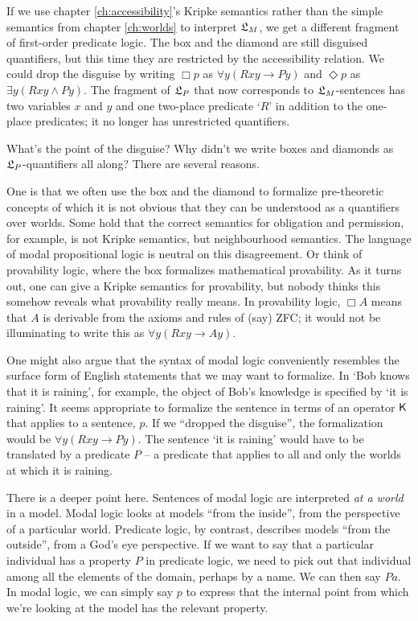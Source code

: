 If we use chapter \ref{ch:accessibility}'s Kripke semantics rather than the
simple semantics from chapter \ref{ch:worlds} to interpret $\mathfrak{L}_{M}$, we get a
different fragment of first-order predicate logic. The box and the diamond are
still disguised quantifiers, but this time they are restricted by the
accessibility relation. We could drop the disguise by writing $\Box p$ as
$\forall y(Rxy \to Py)$ and $\Diamond p$ as $\exists y(Rxy \land Py)$. The
fragment of $\mathfrak{L}_P$ that now corresponds to $\mathfrak{L}_M$-sentences has two variables
$x$ and $y$ and one two-place predicate `$R$' in addition to the one-place
predicates; it no longer has unrestricted quantifiers.

What's the point of the disguise? Why didn't we write boxes and diamonds as
$\mathfrak{L}_P$-quantifiers all along? There are several reasons.

One is that we often use the box and the diamond to formalize pre-theoretic
concepts of which it is not obvious that they can be understood as a quantifiers
over worlds. Some hold that the correct semantics for obligation and permission,
for example, is not Kripke semantics, but neighbourhood semantics. The language
of modal propositional logic is neutral on this disagreement. Or think of
provability logic, where the box formalizes mathematical provability. As it
turns out, one can give a Kripke semantics for provability, but nobody thinks
this somehow reveals what provability really means. In provability logic,
$\Box A$ means that $A$ is derivable from the axioms and rules of (say) ZFC; it
would not be illuminating to write this as $\forall y(Rxy \to Ay)$.

One might also argue that the syntax of modal logic conveniently resembles the
surface form of English statements that we may want to formalize. In `Bob knows
that it is raining', for example, the object of Bob's knowledge is specified by
`it is raining'. It seems appropriate to formalize the sentence in terms of an
operator $\operatorname{\mathsf{K}{}}$ that applies to a sentence, $p$. If we ``dropped the disguise'',
the formalization would be $\forall y(Rxy \to Py)$. The sentence `it is raining'
would have to be translated by a predicate $P$ -- a predicate that applies to
all and only the worlds at which it is raining.

There is a deeper point here. Sentences of modal logic are interpreted \emph{at
  a world} in a model. Modal logic looks at models ``from the inside'', from the
perspective of a particular world. Predicate logic, by contrast, describes
models ``from the outside'', from a God's eye perspective. If we want to say
that a particular individual has a property $P$ in predicate logic, we need to
pick out that individual among all the elements of the domain, perhaps by a
name. We can then say $Pa$. In modal logic, we can simply say $p$ to express
that the internal point from which we're looking at the model has the relevant
property.

